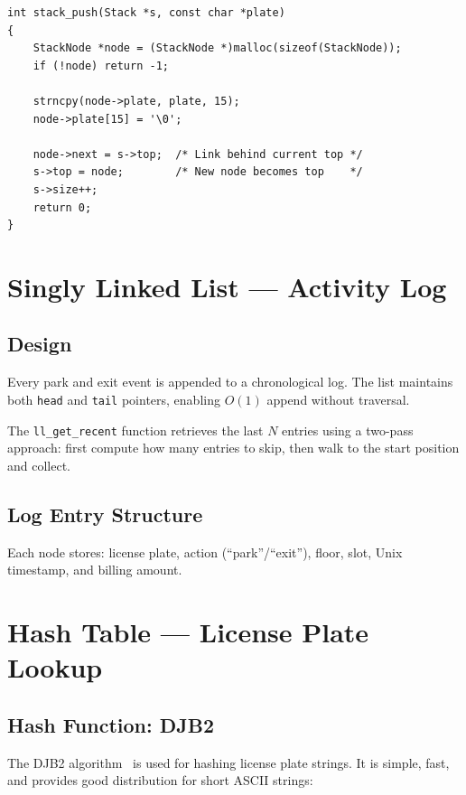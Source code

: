 \documentclass[12pt, a4paper]{report}
\begin{document}
\begin{lstlisting}[style=cstyle, caption={Stack push --- linked-list head insertion}]
int stack_push(Stack *s, const char *plate)
{
    StackNode *node = (StackNode *)malloc(sizeof(StackNode));
    if (!node) return -1;

    strncpy(node->plate, plate, 15);
    node->plate[15] = '\0';

    node->next = s->top;  /* Link behind current top */
    s->top = node;        /* New node becomes top    */
    s->size++;
    return 0;
}
\end{lstlisting}

\section{Singly Linked List --- Activity Log}

\subsection{Design}

Every park and exit event is appended to a chronological log.  The list
maintains both \texttt{head} and \texttt{tail} pointers, enabling
$O(1)$ append without traversal.

The \texttt{ll\_get\_recent} function retrieves the last $N$ entries
using a two-pass approach: first compute how many entries to skip, then
walk to the start position and collect.

\subsection{Log Entry Structure}

Each node stores: license plate, action (``park''/``exit''), floor,
slot, Unix timestamp, and billing amount.

\section{Hash Table --- License Plate Lookup}

\subsection{Hash Function: DJB2}

The DJB2 algorithm~\cite{djb2hash} is used for hashing license plate
strings.  It is simple, fast, and provides good distribution for short
ASCII strings:
\end{document}
